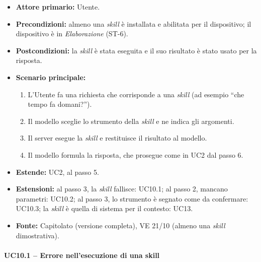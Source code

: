 \documentclass[12pt,a4paper]{article}
\newcommand{\tightlist}{\setlength{\itemsep}{1pt}\setlength{\parskip}{0pt}}
\begin{document}
\begin{itemize}

\tightlist

\item \textbf{Attore primario:} Utente.

\item \textbf{Precondizioni:} almeno una \emph{skill} è installata e abilitata per il dispositivo; il dispositivo è in \emph{Elaborazione} (ST-6).

\item \textbf{Postcondizioni:} la \emph{skill} è stata eseguita e il suo risultato è stato usato per la risposta.

\item \textbf{Scenario principale:}

\begin{enumerate}

\tightlist

\item L'Utente fa una richiesta che corrisponde a una \emph{skill} (ad esempio ``che tempo fa domani?'').

\item Il modello sceglie lo strumento della \emph{skill} e ne indica gli argomenti.

\item Il server esegue la \emph{skill} e restituisce il risultato al modello.

\item Il modello formula la risposta, che prosegue come in UC2 dal passo 6.

\end{enumerate}

\item \textbf{Estende:} UC2, al passo 5.

\item \textbf{Estensioni:} al passo 3, la \emph{skill} fallisce: UC10.1; al passo 2, mancano parametri: UC10.2; al passo 3, lo strumento è segnato come da confermare: UC10.3; la \emph{skill} è quella di sistema per il contesto: UC13.

\item \textbf{Fonte:} Capitolato (versione completa), VE 21/10 (almeno una \emph{skill} dimostrativa).

\end{itemize}



\paragraph{UC10.1 -- Errore nell'esecuzione di una skill}
\end{document}
